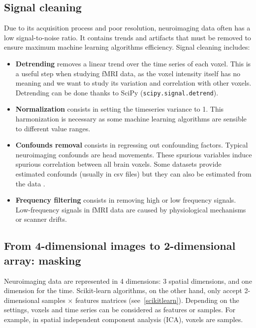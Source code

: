 \documentclass{frontiersSCNS} %
\begin{document}
\subsection{Signal cleaning}

Due to its acquisition process and poor resolution, neuroimaging data often has a low
signal-to-noise ratio. It contains trends and artifacts that must be removed
to ensure maximum machine learning algorithms efficiency. Signal cleaning
includes:
\begin{itemize}
    \item{\bf Detrending} removes a linear trend over the time series of each
        voxel. This is a useful step when studying fMRI data, as the voxel
        intensity itself has no meaning and we want to study its variation and
        correlation with other voxels. Detrending can be done thanks to SciPy
        (\texttt{scipy.signal.detrend}).
    \item{\bf Normalization} consists in setting the timeseries variance to 1.
        This harmonization is necessary as some machine learning algorithms are
        sensible to different value ranges.
    \item{\bf Confounds removal} consists in regressing out confounding factors.
        Typical neuroimaging confounds are head movements. These spurious
        variables induce spurious correlation between all brain voxels.
        Some datasets provide estimated confounds (usually in csv files) but
        they can also be estimated from the data \citep{behzadi2007}.
    \item{\bf Frequency filtering} consists in removing high or low
        frequency signals. Low-frequency signals in fMRI data are caused by
        physiological mechanisms or scanner drifts.
\end{itemize}

\subsection{From 4-dimensional images to 2-dimensional array: masking}

\label{sec:unmasking}

Neuroimaging data are represented in 4 dimensions: 3 spatial dimensions, and 
one dimension for the time.
Scikit-learn algorithms, on the other hand, only accept 2-dimensional
samples $\times$ features matrices (see~\ref{scikitlearn}).
Depending on the settings, voxels and time series can be
considered as features
or samples. For example, in spatial independent component analysis (ICA),
voxels are samples.
\end{document}
